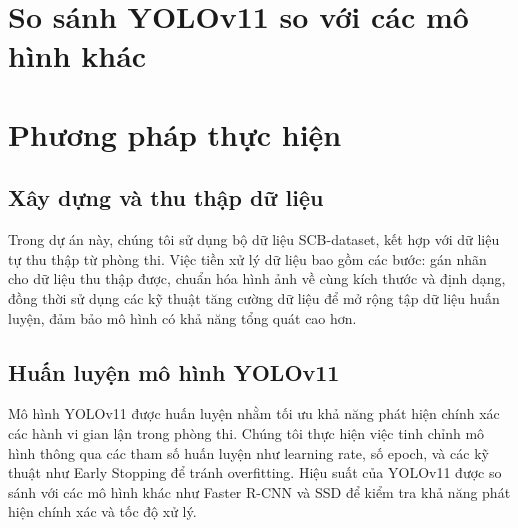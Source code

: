 \documentclass[conference]{IEEEtran}
\begin{document}
\section{So sánh YOLOv11 so với các mô hình khác}
\begin{table}[h]
\centering
\caption{So sánh YOLOv11 với các mô hình phát hiện đối tượng khác}
\label{tab:comparison}
\end{table}
\section{Phương pháp thực hiện}
\subsection{Xây dựng và thu thập dữ liệu}
Trong dự án này, chúng tôi sử dụng bộ dữ liệu SCB-dataset, kết hợp với dữ liệu tự thu thập từ phòng thi. Việc tiền xử lý dữ liệu bao gồm các bước: gán nhãn cho dữ liệu thu thập được, chuẩn hóa hình ảnh về cùng kích thước và định dạng, đồng thời sử dụng các kỹ thuật tăng cường dữ liệu để mở rộng tập dữ liệu huấn luyện, đảm bảo mô hình có khả năng tổng quát cao hơn.

\subsection{Huấn luyện mô hình YOLOv11}
Mô hình YOLOv11 được huấn luyện nhằm tối ưu khả năng phát hiện chính xác các hành vi gian lận trong phòng thi. Chúng tôi thực hiện việc tinh chỉnh mô hình thông qua các tham số huấn luyện như learning rate, số epoch, và các kỹ thuật như Early Stopping để tránh overfitting. Hiệu suất của YOLOv11 được so sánh với các mô hình khác như Faster R-CNN và SSD để kiểm tra khả năng phát hiện chính xác và tốc độ xử lý.
\end{document}
